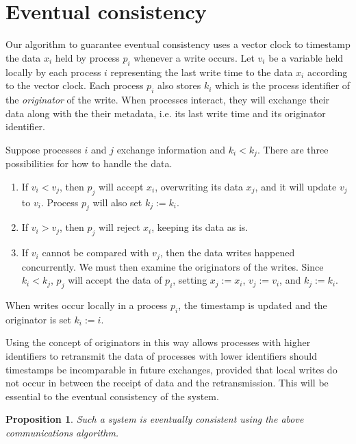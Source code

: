 \documentclass{article}
\newtheorem{proposition}{Proposition}
\begin{document}
\section{Eventual consistency}

Our algorithm to guarantee eventual consistency uses a vector clock to
timestamp the data $x_i$ held by process $p_i$ whenever a write occurs. Let
$v_i$ be a variable held locally by each process $i$ representing the last
write time to the data $x_i$ according to the vector clock. Each process $p_i$
also stores $k_i$ which is the process identifier of the \emph{originator} of
the write. When processes interact, they will exchange their data along with
the their metadata, i.e. its last write time and its originator identifier.

Suppose processes $i$ and $j$ exchange information and $k_i < k_j$. There are
three possibilities for how to handle the data.

\begin{enumerate}
    \item If $v_i < v_j$, then $p_j$ will accept $x_i$, overwriting its data
        $x_j$, and it will update $v_j$ to $v_i$. Process $p_j$ will also set
        $k_j := k_i$.

    \item If $v_i > v_j$, then $p_j$ will reject $x_i$, keeping its data as is.

    \item If $v_i$ cannot be compared with $v_j$, then the data writes happened
        concurrently. We must then examine the originators of the writes. Since
        $k_i < k_j$, $p_j$ will accept the data of $p_i$, setting $x_j := x_i$,
        $v_j := v_i$, and $k_j := k_i$.
\end{enumerate}

When writes occur locally in a process $p_i$, the timestamp is updated and the
originator is set $k_i := i$.

Using the concept of originators in this way allows processes with higher
identifiers to retransmit the data of processes with lower identifiers should
timestamps be incomparable in future exchanges, provided that local writes do
not occur in between the receipt of data and the retransmission. This will be
essential to the eventual consistency of the system.

\begin{proposition}
    Such a system is eventually consistent using the above communications
    algorithm.
\end{proposition}
\end{document}
